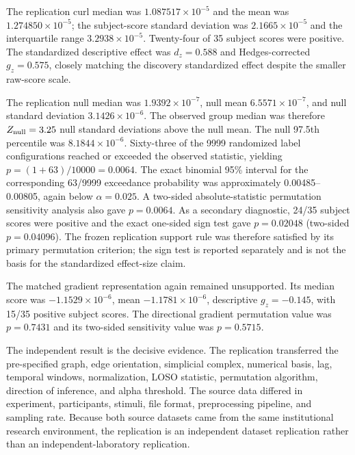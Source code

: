 \documentclass[12pt]{article}
\begin{document}
The replication curl median was $1.087517\times10^{-5}$ and the mean was $1.274850\times10^{-5}$; the subject-score standard deviation was $2.1665\times10^{-5}$ and the interquartile range $3.2938\times10^{-5}$. Twenty-four of 35 subject scores were positive. The standardized descriptive effect was $d_z=0.588$ and Hedges-corrected $g_z=0.575$, closely matching the discovery standardized effect despite the smaller raw-score scale.

The replication null median was $1.9392\times10^{-7}$, null mean $6.5571\times10^{-7}$, and null standard deviation $3.1426\times10^{-6}$. The observed group median was therefore $Z_{\rm null}=3.25$ null standard deviations above the null mean. The null 97.5th percentile was $8.1844\times10^{-6}$. Sixty-three of the 9999 randomized label configurations reached or exceeded the observed statistic, yielding $p=(1+63)/10000=0.0064$. The exact binomial 95\% interval for the corresponding 63/9999 exceedance probability was approximately 0.00485--0.00805, again below $\alpha=0.025$. A two-sided absolute-statistic permutation sensitivity analysis also gave $p=0.0064$. As a secondary diagnostic, 24/35 subject scores were positive and the exact one-sided sign test gave $p=0.02048$ (two-sided $p=0.04096$). The frozen replication support rule was therefore satisfied by its primary permutation criterion; the sign test is reported separately and is not the basis for the standardized effect-size claim.

The matched gradient representation again remained unsupported. Its median score was $-1.1529\times10^{-6}$, mean $-1.1781\times10^{-6}$, descriptive $g_z=-0.145$, with 15/35 positive subject scores. The directional gradient permutation value was $p=0.7431$ and its two-sided sensitivity value was $p=0.5715$.

The independent result is the decisive evidence. The replication transferred the pre-specified graph, edge orientation, simplicial complex, numerical basis, lag, temporal windows, normalization, LOSO statistic, permutation algorithm, direction of inference, and alpha threshold. The source data differed in experiment, participants, stimuli, file format, preprocessing pipeline, and sampling rate. Because both source datasets came from the same institutional research environment, the replication is an independent dataset replication rather than an independent-laboratory replication.
\end{document}
